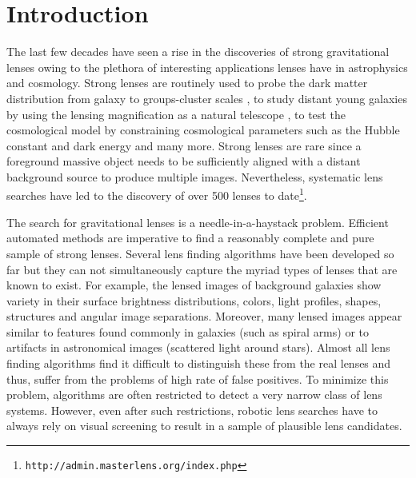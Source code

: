 \documentclass[useAMS,usenatbib,a4paper]{mn2e}
\begin{document}
\section{Introduction}
\label{sec:intro}

The last few decades have seen a rise in the discoveries of strong
gravitational lenses owing to the plethora of interesting applications
lenses have in astrophysics and cosmology. Strong lenses are routinely
used to probe the dark matter distribution from galaxy
\citep[e.g.][]{Koopmans2006,Barnabe2009,Leier2011,Sonnenfeld2015} to groups-cluster
scales
\citep[e.g.][]{Limousin2008,Zitrin2011,Oguri2012,More2012,Newman2013}, to
study distant young galaxies by using the lensing magnification as a
natural telescope \citep[e.g.][]{Zitrin2009,Zheng2012,Whitaker2014}, to
test the cosmological model by constraining cosmological parameters such
as the Hubble constant and dark energy
\citep[e.g.][]{Suyu2010,Collett2012,Collett2014,Sereno2014} and many more. Strong
lenses are rare since a foreground massive object needs to be
sufficiently aligned with a distant background source to produce
multiple images. Nevertheless, systematic lens searches have led to the
discovery of over 500 lenses to
date\footnote{\texttt{http://admin.masterlens.org/index.php}}.

The search for gravitational lenses is a needle-in-a-haystack problem.
Efficient automated methods are imperative to find a reasonably complete
and pure sample of strong lenses. Several lens finding algorithms have
been developed so far
\citep[e.g.][]{Lenzen2004,Alard2006,Seidel2007,More2012,Brault2014,Gavazzi2014} but they can not
simultaneously capture the myriad types of lenses that are known to
exist. For example, the lensed images of background galaxies show
variety in their surface brightness distributions, colors, light
profiles, shapes, structures and angular image separations.  Moreover,
many lensed images appear similar to features found commonly in galaxies
(such as spiral arms) or to artifacts in astronomical images (scattered
light around stars).  Almost all lens finding algorithms find it
difficult to distinguish these from the real lenses and thus, suffer
from the problems of high rate of false positives.  To minimize this problem,
algorithms are often restricted to detect a very narrow class of lens
systems. However, even after such restrictions, robotic lens searches
have to always rely on visual screening to result in a sample of plausible
lens candidates.
\end{document}
